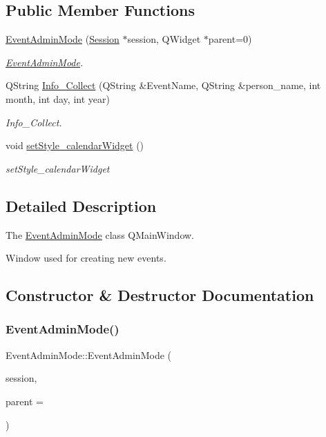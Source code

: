 \subsection*{Public Member Functions}
\begin{DoxyCompactItemize}
\item 
\hyperlink{class_event_admin_mode_a6f7d4e143b04287d436e9be16324626d}{Event\+Admin\+Mode} (\hyperlink{class_session}{Session} $\ast$session, Q\+Widget $\ast$parent=0)
\begin{DoxyCompactList}\small\item\em \hyperlink{class_event_admin_mode}{Event\+Admin\+Mode}. \end{DoxyCompactList}\item 
Q\+String \hyperlink{class_event_admin_mode_ac659c776c70f4b7f8d6c05ba29b1ae7d}{Info\+\_\+\+Collect} (Q\+String \&Event\+Name, Q\+String \&person\+\_\+name, int month, int day, int year)
\begin{DoxyCompactList}\small\item\em Info\+\_\+\+Collect. \end{DoxyCompactList}\item 
void \hyperlink{class_event_admin_mode_a8e7abbf82a05352cacc29d544a682139}{set\+Style\+\_\+calendar\+Widget} ()
\begin{DoxyCompactList}\small\item\em set\+Style\+\_\+calendar\+Widget \end{DoxyCompactList}\end{DoxyCompactItemize}


\subsection{Detailed Description}
The \hyperlink{class_event_admin_mode}{Event\+Admin\+Mode} class  Q\+Main\+Window. 

Window used for creating new events. 

\subsection{Constructor \& Destructor Documentation}
\mbox{\label{class_event_admin_mode_a6f7d4e143b04287d436e9be16324626d}} 
\subsubsection{\texorpdfstring{Event\+Admin\+Mode()}{EventAdminMode()}}
{\footnotesize\ttfamily Event\+Admin\+Mode\+::\+Event\+Admin\+Mode (\begin{DoxyParamCaption}\item[{\hyperlink{class_session}{Session} $\ast$}]{session,  }\item[{Q\+Widget $\ast$}]{parent = {} }\end{DoxyParamCaption})\hspace{0.3cm}{\ttfamily [explicit]}}



